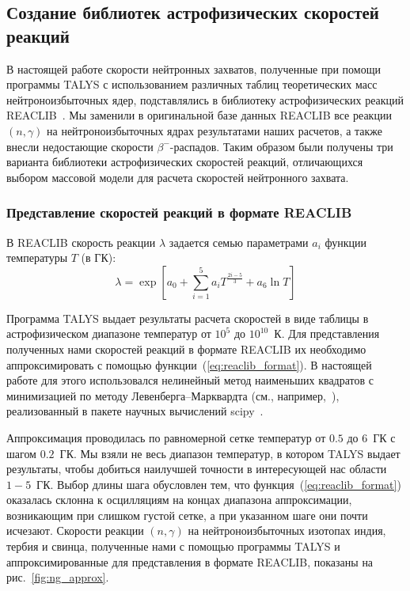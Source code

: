 \subsection{Создание библиотек астрофизических скоростей реакций} \label{sec:ratelib}
В настоящей работе скорости нейтронных захватов, полученные при помощи программы TALYS с использованием различных таблиц теоретических масс нейтроноизбыточных ядер, подставлялись в библиотеку астрофизических реакций REACLIB~\cite{reaclib2010}. Мы заменили в оригинальной базе данных REACLIB все реакции $(n,\gamma)$ на нейтроноизбыточных ядрах результатами наших расчетов, а также внесли недостающие скорости $\beta^-$-распадов. Таким образом были получены три варианта библиотеки астрофизических скоростей реакций, отличающихся выбором массовой модели для расчета скоростей нейтронного захвата.

\subsubsection{Представление скоростей реакций в формате REACLIB}
В REACLIB скорость реакции $\lambda$ задается семью параметрами $a_i$ функции температуры $T$ (в ГК):
\begin{equation}
    \lambda = \exp \left[ a_0 + \sum_{i=1}^5 a_i T^{\frac{2i-5}{3}} + a_6 \ln T \right]
    \label{eq:reaclib_format}
\end{equation}

Программа TALYS выдает результаты расчета скоростей в виде таблицы в астрофизическом диапазоне температур от $10^5$ до $10^{10}$~К. Для представления полученных нами скоростей реакций в формате REACLIB их необходимо аппроксимировать с помощью функции~(\ref{eq:reaclib_format}). В настоящей работе для этого использовался нелинейный метод наименьших квадратов с минимизацией по методу Левенберга--Марквардта (см., например,~\cite{levenberg1944}), реализованный в пакете научных вычислений scipy~\cite{scipy2020}. 

Аппроксимация проводилась по равномерной сетке температур от $0.5$ до $6$~ГК с шагом $0.2$~ГК. Мы взяли не весь диапазон температур, в котором TALYS выдает результаты, чтобы добиться наилучшей точности в интересующей нас области $1-5$~ГК. Выбор длины шага обусловлен тем, что функция~(\ref{eq:reaclib_format}) оказалась склонна к осцилляциям на концах диапазона аппроксимации, возникающим при слишком густой сетке, а при указанном шаге они почти исчезают. Скорости реакции $(n,\gamma)$ на нейтроноизбыточных изотопах индия, тербия и свинца, полученные нами с помощью программы TALYS и аппроксимированные для представления в формате REACLIB, показаны на рис.~\ref{fig:ng_approx}. 

